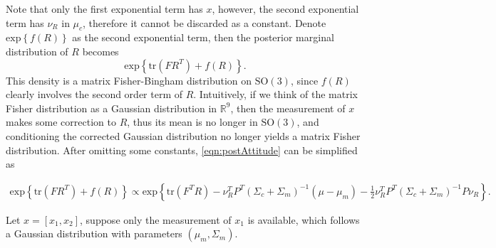 \documentclass[10pt]{article}
\newcommand{\tr}[1]{\ensuremath{\mathrm{tr}\left( #1 \right)}}
\newcommand{\SO}{\ensuremath{\mathrm{SO(3)}}}
\newcommand{\real}[1]{\ensuremath{\mathbb{R}^{ #1 }}}
\newcommand{\expb}[1]{\ensuremath{\mathrm{exp}\left\{#1\right\}}}
\begin{document}
Note that only the first exponential term has $x$, however, the second exponential term has $\nu_R$ in $\mu_c$, therefore it cannot be discarded as a constant.
Denote $\expb{f(R)}$ as the second exponential term, then the posterior marginal 
distribution of $R$ becomes
\begin{equation} \label{eqn:postAttitude}
	\expb{\tr{FR^T}+f(R)}.
\end{equation}
This density is a matrix Fisher-Bingham distribution on $\SO$, since $f(R)$ clearly involves the second order term of $R$.
Intuitively, if we think of the matrix Fisher distribution as a Gaussian distribution in $\real{9}$, then the measurement of $x$ makes some correction to $R$, thus its mean is no longer in $\SO$, and conditioning the corrected Gaussian distribution no longer yields a matrix Fisher distribution.
After omitting some constants, \eqref{eqn:postAttitude} can be simplified as

\begin{align}
	\expb{\tr{FR^T}+f(R)} \propto \expb{\tr{F^TR} - \nu_R^TP^T(\Sigma_c+\Sigma_m)^{-1}(\mu-\mu_m) - \frac{1}{2}\nu_R^TP^T(\Sigma_c+\Sigma_m)^{-1}P\nu_R}.
\end{align}

Let $x = [x_1,x_2]$, suppose only the measurement of $x_1$ is available, which follows a Gaussian distribution with parameters $(\mu_m,\Sigma_m)$.
\end{document}
